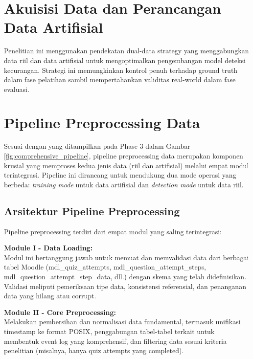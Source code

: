 \section{Akuisisi Data dan Perancangan Data Artifisial}
\label{sec:sumberDataLog}
Penelitian ini menggunakan pendekatan dual-data strategy yang menggabungkan data riil dan data artifisial untuk mengoptimalkan pengembangan model deteksi kecurangan. Strategi ini memungkinkan kontrol penuh terhadap ground truth dalam fase pelatihan sambil mempertahankan validitas real-world dalam fase evaluasi.

\section{Pipeline Preprocessing Data}
\label{sec:pipelinePreprocessing}
Sesuai dengan yang ditampilkan pada Phase 3 dalam Gambar \ref{fig:comprehensive_pipeline}, pipeline preprocessing data merupakan komponen krusial yang memproses kedua jenis data (riil dan artifisial) melalui empat modul terintegrasi. Pipeline ini dirancang untuk mendukung dua mode operasi yang berbeda: \textit{training mode} untuk data artifisial dan \textit{detection mode} untuk data riil.

\subsection{Arsitektur Pipeline Preprocessing}
\label{sec:arsitekturPipelinePreprocessing}

Pipeline preprocessing terdiri dari empat modul yang saling terintegrasi:

\textbf{Module I - Data Loading:} \\
Modul ini bertanggung jawab untuk memuat dan memvalidasi data dari berbagai tabel Moodle (mdl\_quiz\_attempts, mdl\_question\_attempt\_steps, mdl\_question\_attempt\_step\_data, dll.) dengan skema yang telah didefinisikan. Validasi meliputi pemeriksaan tipe data, konsistensi referensial, dan penanganan data yang hilang atau corrupt.

\textbf{Module II - Core Preprocessing:} \\
Melakukan pembersihan dan normalisasi data fundamental, termasuk unifikasi timestamp ke format POSIX, penggabungan tabel-tabel terkait untuk membentuk event log yang komprehensif, dan filtering data sesuai kriteria penelitian (misalnya, hanya quiz attempts yang completed).

